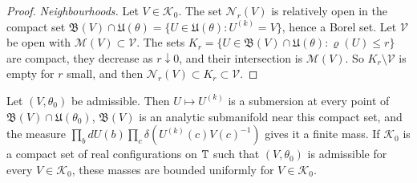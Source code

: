 \begin{proof}
\emph{Neighbourhoods.} Let $V\in\mathcal K_0$. The set $\mathscr N_r(V)$ is relatively open in the compact set $\mathfrak B(V)\cap\mathfrak U(\theta)=\{U\in\mathfrak U(\theta):U^{(k)}=V\}$, hence a Borel set. Let $\mathcal V$ be open with $\mathscr M(V)\subset\mathcal V$. The sets $K_r=\{U\in\mathfrak B(V)\cap\mathfrak U(\theta):\varrho(U)\le r\}$ are compact, they decrease as $r\downarrow0$, and their intersection is $\mathscr M(V)$. So $K_r\setminus\mathcal V$ is empty for $r$ small, and then $\mathscr N_r(V)\subset K_r\subset\mathcal V$.
\end{proof}

\begin{lemma}\label{lem:ol-fibre-mass}
Let $(V,\theta_0)$ be admissible. Then $U\mapsto U^{(k)}$ is a submersion at every point of $\mathfrak B(V)\cap\mathfrak U(\theta_0)$, $\mathfrak B(V)$ is an analytic submanifold near this compact set, and the measure $\prod_bdU(b)\prod_c\delta(U^{(k)}(c)V(c)^{-1})$ gives it a finite mass. If $\mathcal K_0$ is a compact set of real configurations on $\mathbb T$ such that $(V,\theta_0)$ is admissible for every $V\in\mathcal K_0$, these masses are bounded uniformly for $V\in\mathcal K_0$.
\end{lemma}

